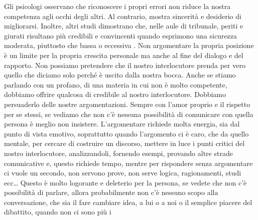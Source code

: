 \documentclass[12pt]{book} %
\begin{document}
Gli psicologi osservano che riconoscere i propri errori non riduce la nostra competenza agli occhi degli altri. Al contrario, mostra sincerità e desiderio di migliorarsi. Inoltre, altri studi dimostrano che, nelle aule di tribunale, periti e giurati risultano più credibili e convincenti quando esprimono una sicurezza moderata, piuttosto che bassa o eccessiva .
Non argomentare la propria posizione è un limite per la propria crescita personale ma anche al fine del
dialogo e del rapporto. Non possiamo pretendere che il nostro interlocutore prenda per vero quello che diciamo solo perché è uscito
dalla nostra bocca. Anche se stiamo parlando con un profano, di una materia in cui non è molto competente, dobbiamo
offrire qualcosa di credibile al nostro interlocutore. Dobbiamo persuaderlo delle nostre argomentazioni. Sempre con
l'amor proprio e il rispetto per se stessi, se vediamo che non c'è nessuna
possibilità di comunicare con quella persona è meglio non insistere. L'argomentare richiede molta
energia, sia dal punto di vista emotivo, soprattutto quando l'argomento ci è caro, che da quello
mentale, per cercare di costruire un discorso, mettere in luce i punti critici del nostro interlocutore, analizzandoli,
fornendo esempi, provando altre strade comunicative e, questo richiede tempo, mentre per rispondere senza argomentare ci vuole
un secondo, non servono prove, non serve logica, ragionamenti, studi ecc… Questo è molto logorante e deleterio per la
persona, se vedete che non c'è possibilità di parlare, allora probabilmente non c'è nessuno
scopo alla conversazione, che sia il fare cambiare idea, a lui o a noi o il semplice piacere del dibattito, quando non ci sono più i
\end{document}
